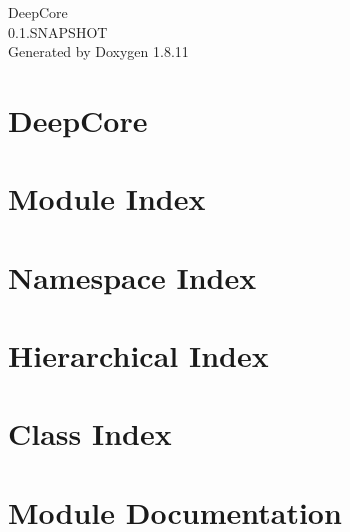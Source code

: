 \documentclass[twoside]{book}
\newcommand{\+}{\discretionary{\mbox{\scriptsize$\hookleftarrow$}}{}{}}
\newcommand{\clearemptydoublepage}{%
  \newpage{\pagestyle{empty}\cleardoublepage}%
}
\begin{document}
\hypersetup{pageanchor=false,
             bookmarksnumbered=true,
             pdfencoding=unicode
            }
\begin{titlepage}
\vspace*{7cm}
\begin{center}%
{\Large Deep\+Core \\[1ex]\large 0.\+1.\+S\+N\+A\+P\+S\+H\+OT }\\
\vspace*{1cm}
{\large Generated by Doxygen 1.8.11}\\
\end{center}
\end{titlepage}
\clearemptydoublepage
\tableofcontents
\clearemptydoublepage
{}
\hypersetup{pageanchor=true}

\chapter{Deep\+Core}
\label{index}\hypertarget{index}{}
\chapter{Module Index}

\chapter{Namespace Index}

\chapter{Hierarchical Index}

\chapter{Class Index}

\chapter{Module Documentation}























\end{document}
